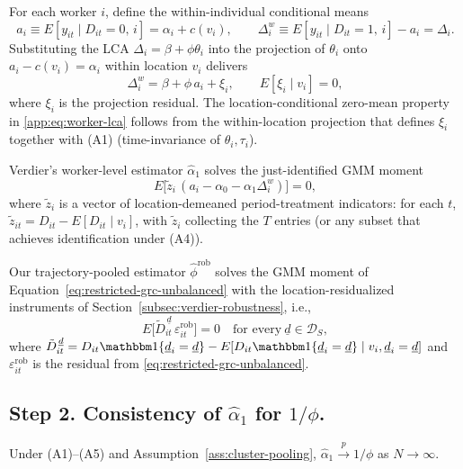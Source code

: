 For each worker $i$, define the within-individual conditional means
\[
a_i \equiv E[y_{it}\mid D_{it}=0,\,i] = \alpha_i + c(v_i),
\qquad
\Delta_i^w \equiv E[y_{it}\mid D_{it}=1,\,i] - a_i = \Delta_i.
\]
Substituting the LCA $\Delta_i = \beta + \phi\theta_i$ into the projection of $\theta_i$ onto $a_i - c(v_i) = \alpha_i$ within location $v_i$ delivers
\begin{equation}\label{app:eq:worker-lca}
\Delta_i^w = \beta + \phi\,a_i + \xi_i,
\qquad E[\xi_i \mid v_i] = 0,
\end{equation}
where $\xi_i$ is the projection residual.
The location-conditional zero-mean property in \eqref{app:eq:worker-lca} follows from the within-location projection that defines $\xi_i$ together with (A1) (time-invariance of $\theta_i,\tau_i$).

Verdier's worker-level estimator $\hat\alpha_1$ solves the just-identified GMM moment
\begin{equation}\label{app:eq:vv-moment}
E\!\big[\tilde z_i\,(a_i - \alpha_0 - \alpha_1 \Delta_i^w)\big] = 0,
\end{equation}
where $\tilde z_i$ is a vector of location-demeaned period-treatment indicators: for each $t$, $\tilde z_{it} = D_{it} - E[D_{it}\mid v_i]$, with $\tilde z_i$ collecting the $T$ entries (or any subset that achieves identification under (A4)).

Our trajectory-pooled estimator $\hat\phi^{\mathrm{rob}}$ solves the GMM moment of Equation~\eqref{eq:restricted-grc-unbalanced} with the location-residualized instruments of Section~\ref{subsec:verdier-robustness}, i.e.,
\begin{equation}\label{app:eq:rob-moment}
E\!\big[\tilde D_{it}^{\,\underline d}\,\varepsilon_{it}^{\mathrm{rob}}\big] = 0
\quad\text{for every}\ \underline d \in \mathcal D_S,
\end{equation}
where $\tilde D_{it}^{\,\underline d} = D_{it}\mathbbm 1\{\underline d_i = \underline d\} - E[D_{it}\mathbbm 1\{\underline d_i = \underline d\}\mid v_i,\underline d_i = \underline d]$ and $\varepsilon_{it}^{\mathrm{rob}}$ is the residual from \eqref{eq:restricted-grc-unbalanced}.

\subsection*{Step 2.  Consistency of \texorpdfstring{$\hat\alpha_1$}{alpha\_1-hat} for \texorpdfstring{$1/\phi$}{1/phi}.}

\begin{lemma}\label{app:lem:vv}
Under (A1)--(A5) and Assumption~\ref{ass:cluster-pooling}, $\hat\alpha_1 \xrightarrow{p} 1/\phi$ as $N \to \infty$.
\end{lemma}

